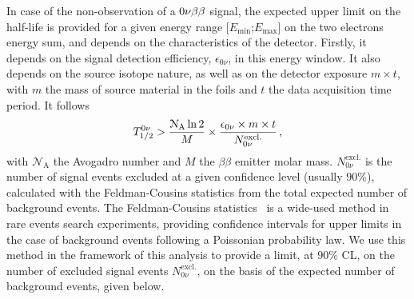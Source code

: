 In case of the non-observation of a $0\nu\beta\beta$ signal, the expected upper limit on the half-life is provided for a given energy range [$E_{\text{min}}$;$E_{\text{max}}$] on the two electrons energy sum, and depends on the characteristics of the detector.
Firstly, it depends on the signal detection efficiency, $\epsilon_{0\nu}$, in this energy window.
It also depends on the source isotope nature, as well as on the detector exposure $m\times t$, with $m$ the mass of source material in the foils and $t$ the data acquisition time period.
It follows
\begin{equation}
  T_{1/2}^{0\nu} > \frac{\mathcal{N}_{\text{A}}\ln{2}}{M}\times \frac{\epsilon_{0\nu}\times m\times t}{N_{0\nu}^{\text{excl.}}}\,,
  \label{eq:tbeta_limit}
\end{equation}
with $\mathcal{N}_{\text{A}}$ the Avogadro number and $M$ the $\beta\beta$ emitter molar mass.
$N_{0\nu}^{\text{excl.}}$ is the number of signal events excluded at a given confidence level (usually $90$\%), calculated with the Feldman-Cousins statistics from the total expected number of background events.
The Feldman-Cousins statistics~\cite{art:feld-cous} is a wide-used method in rare events search experiments, providing confidence intervals for upper limits in the case of background events following a Poissonian probability law.
We use this method in the framework of this analysis to provide a limit, at $90\%$ CL, on the number of excluded signal events $N_{0\nu}^{\text{excl.}}$, on the basis of the expected number of background events, given below.
